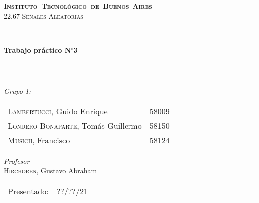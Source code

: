 \begin{titlepage}
\newcommand{\HRule}{\rule{\linewidth}{0.5mm}}
\center
\mbox{\textsc{\LARGE \bfseries {Instituto Tecnológico de Buenos Aires}}}\\[1.5cm]
\textsc{\Large 22.67 Señales Aleatorias}\\[0.5cm]


\HRule \\[0.6cm]
{ \Huge \bfseries Trabajo práctico N$^{\circ}$3}\\[0.4cm] 
\HRule \\[1.5cm]


{\large

\emph{Grupo 1:}\\
\vspace{3pt}

\begin{tabular}{lr} 	
\textsc{Lambertucci}, Guido Enrique  & 58009 \\
\textsc{Londero Bonaparte}, Tomás Guillermo  & 58150 \\
\textsc{Musich}, Francisco  & 58124\\
\end{tabular}

\vspace{20pt}

\emph{Profesor}\\
\textsc{Hirchoren}, Gustavo Abraham \\
\vspace{3pt}

\vspace{100pt}

\begin{tabular}{ll}

Presentado: & ??/??/21\\

\end{tabular}

}

\vfill

\end{titlepage}
